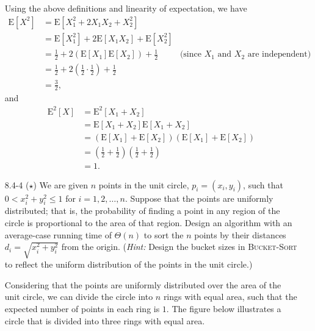 \documentclass{report}
\makeatletter
\renewenvironment{framed}{%
 \def\FrameCommand##1{\hskip\@totalleftmargin
 \fboxsep=\FrameSep\fbox{##1}}%
 \MakeFramed {\advance\hsize-\width
   \@totalleftmargin\z@ \linewidth\hsize
   \@setminipage}}%
 {\par\unskip\endMakeFramed}
\makeatother
\begin{document}
\begin{enumerate}
\begin{framed}
Using the above definitions and linearity of expectation, we have
\begin{equation*}
\begin{aligned}
  \text{E}[X^2] &= \text{E}[X_1^2 + 2 X_1 X_2 + X_2^2]\\
                &= \text{E}[X_1^2] + 2 \text{E}[X_1 X_2] + \text{E}[X_2^2]\\
                &= \frac{1}{2} + 2 \left(\text{E}[X_1] \text{E}[X_2]\right) + \frac{1}{2} & \text{(since $X_1$ and $X_2$ are independent)}\\
                &= \frac{1}{2} + 2 \left(\frac{1}{2} \cdot \frac{1}{2}\right) + \frac{1}{2}\\
                &= \frac{3}{2},
\end{aligned}
\end{equation*}
and
\begin{equation*}
\begin{aligned}
  \text{E}^2[X] &= \text{E}^2[X_1 + X_2]\\
                &= \text{E}[X_1 + X_2] \text{E}[X_1 + X_2]\\
                &= ( \text{E}[X_1] + \text{E}[X_2] ) ( \text{E}[X_1] + \text{E}[X_2] )\\
                &= \left( \frac{1}{2} + \frac{1}{2} \right) \left( \frac{1}{2} + \frac{1}{2} \right)\\
                &= 1.
\end{aligned}
\end{equation*}
\end{framed}

\newpage

\item[8.4-4]{($\star$) We are given $n$ points in the unit circle,
$p_i = (x_i, y_i)$, such that $0 < x^2_i + y^2_i \le 1$ for
$i = 1, 2, \dots, n$. Suppose that the points are uniformly distributed; that
is, the probability of finding a point in any region of the circle is
proportional to the area of that region. Design an algorithm with an
average-case running time of $\Theta(n)$ to sort the $n$ points by their
distances $d_i = \sqrt{x^2_i + y^2_i}$ from the origin. (\emph{Hint:} Design the
bucket sizes in \textsc{Bucket-Sort} to reflect the uniform distribution of the
points in the unit circle.)}

\begin{framed}

Considering that the points are uniformly distributed over the area of the unit
circle, we can divide the circle into $n$ rings with equal area, such that the
expected number of points in each ring is $1$. The figure below illustrates
a circle that is divided into three rings with equal area.


\end{framed}
\end{enumerate}
\end{document}
